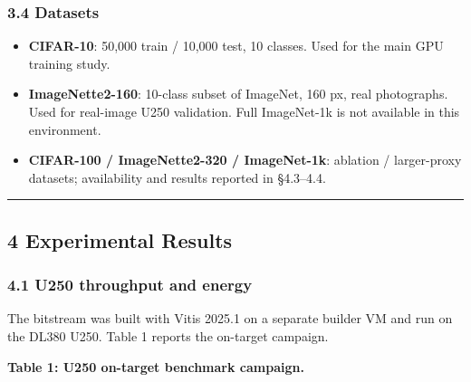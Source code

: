 \documentclass[
]{article}
\providecommand{\tightlist}{%
  \setlength{\itemsep}{0pt}\setlength{\parskip}{0pt}}
\begin{document}
\hypertarget{datasets}{%
\subsubsection{3.4 Datasets}\label{datasets}}

\begin{itemize}
\tightlist
\item
  \textbf{CIFAR-10}: 50,000 train / 10,000 test, 10 classes. Used for
  the main GPU training study.
\item
  \textbf{ImageNette2-160}: 10-class subset of ImageNet, 160 px, real
  photographs. Used for real-image U250 validation. Full ImageNet-1k is
  not available in this environment.
\item
  \textbf{CIFAR-100 / ImageNette2-320 / ImageNet-1k}: ablation /
  larger-proxy datasets; availability and results reported in §4.3--4.4.
\end{itemize}

\begin{center}\rule{0.5\linewidth}{0.5pt}\end{center}

\hypertarget{experimental-results}{%
\subsection{4 Experimental Results}\label{experimental-results}}

\hypertarget{u250-throughput-and-energy}{%
\subsubsection{4.1 U250 throughput and
energy}\label{u250-throughput-and-energy}}

The bitstream was built with Vitis 2025.1 on a separate builder VM and
run on the DL380 U250. Table 1 reports the on-target campaign.

\textbf{Table 1: U250 on-target benchmark campaign.}
\end{document}
